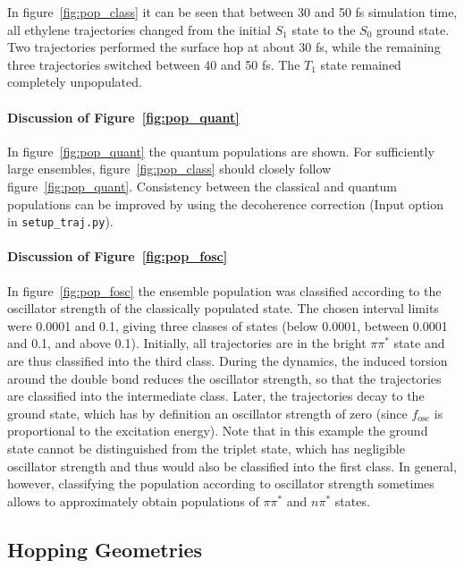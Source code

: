 \documentclass[a4paper,11pt,DIV=15,openany]{scrbook}
\newcommand{\ttt}[1]{\texttt{#1}}
\begin{document}
In figure~\ref{fig:pop_class} it can be seen that between 30 and 50 fs simulation time, all ethylene trajectories changed from the initial $S_1$ state to the $S_0$ ground state. Two trajectories performed the surface hop at about 30 fs, while the remaining three trajectories switched between 40 and 50 fs. The $T_1$ state remained completely unpopulated. 

\paragraph{Discussion of Figure~\ref{fig:pop_quant}}

In figure~\ref{fig:pop_quant} the quantum populations are shown. For sufficiently large ensembles, figure~\ref{fig:pop_class} should closely follow figure~\ref{fig:pop_quant}. Consistency between the classical and quantum populations can be improved by using the decoherence correction (Input option in \ttt{setup\_traj.py}).

\paragraph{Discussion of Figure~\ref{fig:pop_fosc}}

In figure~\ref{fig:pop_fosc} the ensemble population was classified according to the oscillator strength of the classically populated state. The chosen interval limits were 0.0001 and 0.1, giving three classes of states (below 0.0001, between 0.0001 and 0.1, and above 0.1). Initially, all trajectories are in the bright $\pi\pi^*$ state and are thus classified into the third class. During the dynamics, the induced torsion around the double bond reduces the oscillator strength, so that the trajectories are classified into the intermediate class. Later, the trajectories decay to the ground state, which has by definition an oscillator strength of zero (since $f_\text{osc}$ is proportional to the excitation energy). Note that in this example the ground state cannot be distinguished from the triplet state, which has negligible oscillator strength and thus would also be classified into the first class. In general, however, classifying the population according to oscillator strength sometimes allows to approximately obtain populations of $\pi\pi^*$ and $n\pi^*$ states.



\clearpage
\subsection{Hopping Geometries}
\end{document}
